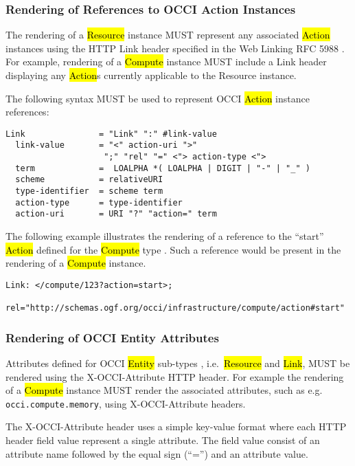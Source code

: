\documentclass[10pt,a4paper]{article}
\begin{document}
\subsubsection{Rendering of References to OCCI Action Instances}
The rendering of a \hl{Resource} instance \cite{occi:core} MUST
represent any associated \hl{Action} instances using the HTTP Link
header specified in the Web Linking RFC 5988 \cite{rfc5988}.  For
example, rendering of a \hl{Compute} instance MUST include a Link
header displaying any \hl{Action}s currently applicable to the
Resource instance.

The following syntax MUST be used to represent OCCI \hl{Action}
instance references:

\begin{verbatim}
Link               = "Link" ":" #link-value
  link-value       = "<" action-uri ">"
                    ";" "rel" "=" <"> action-type <">
  term             =  LOALPHA *( LOALPHA | DIGIT | "-" | "_" )
  scheme           = relativeURI
  type-identifier  = scheme term
  action-type      = type-identifier
  action-uri       = URI "?" "action=" term
\end{verbatim}

The following example illustrates the rendering of a reference to the
``start'' \hl{Action} defined for the \hl{Compute} type
\cite{occi:infrastructure}. Such a reference would be present in the
rendering of a \hl{Compute} instance.

\begin{verbatim}
Link: </compute/123?action=start>;
    rel="http://schemas.ogf.org/occi/infrastructure/compute/action#start"
\end{verbatim}

\subsubsection{Rendering of OCCI Entity Attributes}
Attributes defined for OCCI \hl{Entity} sub-types \cite{occi:core},
i.e.~\hl{Resource} and \hl{Link}, MUST be rendered using the
X-OCCI-Attribute HTTP header. For example the rendering of a
\hl{Compute} instance MUST render the associated attributes, such as
e.g. \texttt{occi.compute.memory}, using X-OCCI-Attribute headers.

The X-OCCI-Attribute header uses a simple key-value format where each
HTTP header field value represent a single attribute. The field value
consist of an attribute name followed by the equal sign (``='') and an
attribute value.
\end{document}
